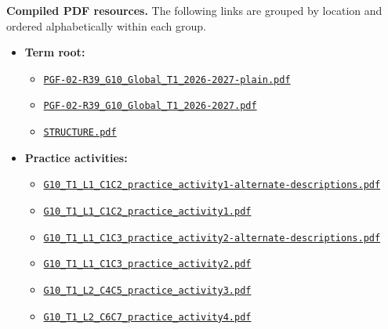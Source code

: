 \documentclass[10pt,letterpaper]{article}
\begin{document}
\textbf{Compiled PDF resources.} The following links are grouped by location
and ordered alphabetically within each group.

\begin{itemize}[leftmargin=1.4em,itemsep=2pt,topsep=2pt]
\item \textbf{Term root:}
  \begin{itemize}[leftmargin=1.4em,itemsep=1pt,topsep=1pt]
  \item \href{https://nolopez338.github.io/global_economics/book2026-2027/grade10/term_1/PGF-02-R39_G10_Global_T1_2026-2027-plain.pdf}{\texttt{PGF-02-R39\_G10\_Global\_T1\_2026-2027-plain.pdf}}
  \item \href{https://nolopez338.github.io/global_economics/book2026-2027/grade10/term_1/PGF-02-R39_G10_Global_T1_2026-2027.pdf}{\texttt{PGF-02-R39\_G10\_Global\_T1\_2026-2027.pdf}}
  \item \href{https://nolopez338.github.io/global_economics/book2026-2027/grade10/term_1/STRUCTURE.pdf}{\texttt{STRUCTURE.pdf}}
  \end{itemize}
\item \textbf{Practice activities:}
  \begin{itemize}[leftmargin=1.4em,itemsep=1pt,topsep=1pt]
  \item \href{https://nolopez338.github.io/global_economics/book2026-2027/grade10/term_1/1-practice_activities/G10_T1_L1_C1C2_practice_activity1-alternate-descriptions.pdf}{\texttt{G10\_T1\_L1\_C1C2\_practice\_activity1-alternate-descriptions.pdf}}
  \item \href{https://nolopez338.github.io/global_economics/book2026-2027/grade10/term_1/1-practice_activities/G10_T1_L1_C1C2_practice_activity1.pdf}{\texttt{G10\_T1\_L1\_C1C2\_practice\_activity1.pdf}}
  \item \href{https://nolopez338.github.io/global_economics/book2026-2027/grade10/term_1/1-practice_activities/G10_T1_L1_C1C3_practice_activity2-alternate-descriptions.pdf}{\texttt{G10\_T1\_L1\_C1C3\_practice\_activity2-alternate-descriptions.pdf}}
  \item \href{https://nolopez338.github.io/global_economics/book2026-2027/grade10/term_1/1-practice_activities/G10_T1_L1_C1C3_practice_activity2.pdf}{\texttt{G10\_T1\_L1\_C1C3\_practice\_activity2.pdf}}
  \item \href{https://nolopez338.github.io/global_economics/book2026-2027/grade10/term_1/1-practice_activities/G10_T1_L2_C4C5_practice_activity3.pdf}{\texttt{G10\_T1\_L2\_C4C5\_practice\_activity3.pdf}}
  \item \href{https://nolopez338.github.io/global_economics/book2026-2027/grade10/term_1/1-practice_activities/G10_T1_L2_C6C7_practice_activity4.pdf}{\texttt{G10\_T1\_L2\_C6C7\_practice\_activity4.pdf}}

\end{itemize}
\end{itemize}
\end{document}
